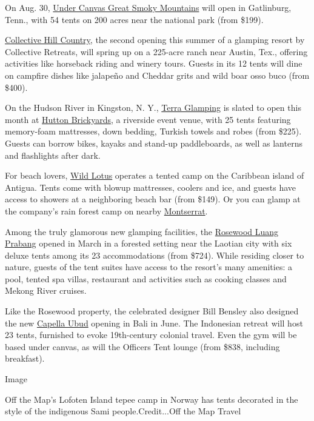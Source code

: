 On Aug. 30,
\href{https://www.undercanvas.com/camps/great-smoky-mountains/}{Under
Canvas Great Smoky Mountains} will open in Gatlinburg, Tenn., with 54
tents on 200 acres near the national park (from \$199).

\href{https://www.collectiveretreats.com/retreat/collective-hill-country/}{Collective
Hill Country}, the second opening this summer of a glamping resort by
Collective Retreats, will spring up on a 225-acre ranch near Austin,
Tex., offering activities like horseback riding and winery tours. Guests
in its 12 tents will dine on campfire dishes like jalapeño and Cheddar
grits and wild boar osso buco (from \$400).

On the Hudson River in Kingston, N. Y.,
\href{https://www.terraglamping.com/catskills/}{Terra Glamping} is
slated to open this month at
\href{https://www.huttonbrickyards.com/\#section1}{Hutton Brickyards}, a
riverside event venue, with 25 tents featuring memory-foam mattresses,
down bedding, Turkish towels and robes (from \$225). Guests can borrow
bikes, kayaks and stand-up paddleboards, as well as lanterns and
flashlights after dark.

For beach lovers, \href{https://www.wildlotuscamp.com/}{Wild Lotus}
operates a tented camp on the Caribbean island of Antigua. Tents come
with blowup mattresses, coolers and ice, and guests have access to
showers at a neighboring beach bar (from \$149). Or you can glamp at the
company's rain forest camp on nearby
\href{https://www.wildlotuscamp.com/montserrat}{Montserrat}.

Among the truly glamorous new glamping facilities, the
\href{https://www.rosewoodhotels.com/en/luang-prabang}{Rosewood Luang
Prabang} opened in March in a forested setting near the Laotian city
with six deluxe tents among its 23 accommodations (from \$724). While
residing closer to nature, guests of the tent suites have access to the
resort's many amenities: a pool, tented spa villas, restaurant and
activities such as cooking classes and Mekong River cruises.

Like the Rosewood property, the celebrated designer Bill Bensley also
designed the new \href{https://www.capellaubud.com/}{Capella Ubud}
opening in Bali in June. The Indonesian retreat will host 23 tents,
furnished to evoke 19th-century colonial travel. Even the gym will be
based under canvas, as will the Officers Tent lounge (from \$838,
including breakfast).

Image

Off the Map's Lofoten Island tepee camp in Norway has tents decorated in
the style of the indigenous Sami people.Credit...Off the Map Travel

